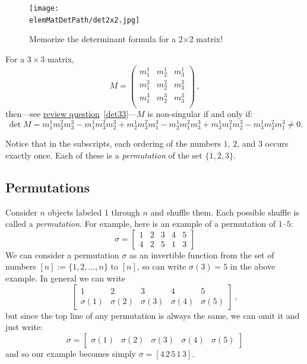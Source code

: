 \begin{figure}
\begin{center}
\texttt{[image: \\elemMatDetPath/det2x2.jpg]}
\end{center}
\caption{Memorize the determinant formula for a 2$\times$2 matrix!}
\end{figure}


\begin{example}
For a $3\times 3$ matrix, \[M=\begin{pmatrix}
m^1_1 & m^1_2 & m^1_3\\[1mm]
m^2_1 & m^2_2 & m^2_3\\[1mm]
m^3_1 & m^3_2 & m^3_3\\
\end{pmatrix}\, ,\] then---see \hyperref[det33]{review question}~\ref{det33}---$M$ is non-singular if and only if:
\vspace{.1cm}
\[
\det M= 
m^1_1m^2_2m^3_3 
- m^1_1m^2_3m^3_2 
+ m^1_2m^2_3m^3_1
- m^1_2m^2_1m^3_3  
+ m^1_3m^2_1m^3_2
- m^1_3m^2_2m^3_1
\neq 0.
\]

\noindent
Notice that in the subscripts, each ordering of the numbers $1$, $2$, and $3$ occurs exactly once.  Each of these is a \emph{permutation} of the set $\{1,2,3\}$.
\end{example}



\subsection{Permutations}
Consider $n$ objects labeled $1$ through $n$ and shuffle them.  Each possible shuffle is called a \emph{permutation}.  
For example, here is an example of a permutation of $1$--$5$:
\[
\sigma = \begin{bmatrix}
1 & 2 & 3 & 4 & 5 \\
4 & 2 & 5 & 1 & 3 
\end{bmatrix}
\]
We can consider a permutation $\sigma$ as an invertible function from the set of numbers $[n] := \{1, 2, \dotsc, n\}$ to $[n]$, so can  write $\sigma(3) = 5$ in the above example. In general we can write
\[\left[\!
\begin{array}{ccccc}
1 & 2 & 3 & 4 & 5 \\[1mm]
\sigma(1) & \sigma(2) & \sigma(3) & \sigma(4) & \sigma(5)
\end{array}\!\right]\, ,
\]
but since the top line of any permutation is always the same, we can omit it and just write:
\[
\sigma = \begin{bmatrix}
\sigma(1) & \sigma(2) & \sigma(3) & \sigma(4) & \sigma(5)
\end{bmatrix}
\]
and so our example becomes simply  $\sigma = [4\, 2\, 5\, 1\, 3]$. 

